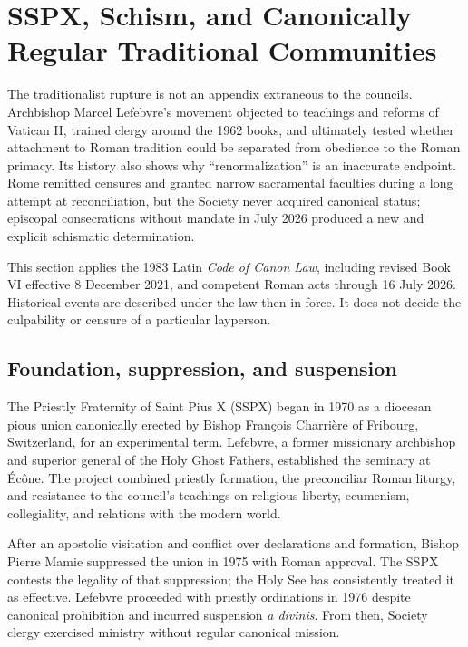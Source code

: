 \section{SSPX, Schism, and Canonically Regular Traditional Communities}

The traditionalist rupture is not an appendix extraneous to the councils. Archbishop Marcel Lefebvre's movement objected to teachings and reforms of Vatican II, trained clergy around the 1962 books, and ultimately tested whether attachment to Roman tradition could be separated from obedience to the Roman primacy. Its history also shows why “renormalization” is an inaccurate endpoint. Rome remitted censures and granted narrow sacramental faculties during a long attempt at reconciliation, but the Society never acquired canonical status; episcopal consecrations without mandate in July 2026 produced a new and explicit schismatic determination.

This section applies the 1983 Latin \emph{Code of Canon Law}, including revised Book VI effective 8 December 2021, and competent Roman acts through 16 July 2026. Historical events are described under the law then in force. It does not decide the culpability or censure of a particular layperson.

\subsection{Foundation, suppression, and suspension}

The Priestly Fraternity of Saint Pius X (SSPX) began in 1970 as a diocesan pious union canonically erected by Bishop François Charrière of Fribourg, Switzerland, for an experimental term. Lefebvre, a former missionary archbishop and superior general of the Holy Ghost Fathers, established the seminary at Écône. The project combined priestly formation, the preconciliar Roman liturgy, and resistance to the council's teachings on religious liberty, ecumenism, collegiality, and relations with the modern world.

After an apostolic visitation and conflict over declarations and formation, Bishop Pierre Mamie suppressed the union in 1975 with Roman approval. The SSPX contests the legality of that suppression; the Holy See has consistently treated it as effective. Lefebvre proceeded with priestly ordinations in 1976 despite canonical prohibition and incurred suspension \emph{a divinis}. From then, Society clergy exercised ministry without regular canonical mission.

